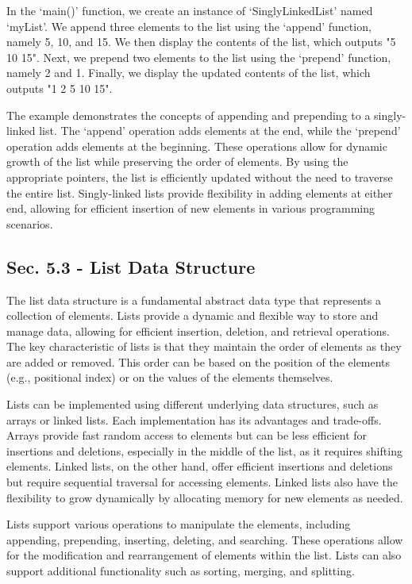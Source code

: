 \begin{solution}
    In the `main()' function, we create an instance of `SinglyLinkedList' named `myList'. We append three elements to the list using the `append' function, namely 5, 10, and 15. We then display the contents of the list, which outputs 
    "5 10 15". Next, we prepend two elements to the list using the `prepend' function, namely 2 and 1. Finally, we display the updated contents of the list, which outputs "1 2 5 10 15".

    The example demonstrates the concepts of appending and prepending to a singly-linked list. The `append' operation adds elements at the end, while the `prepend' operation adds elements at the beginning. These operations allow for dynamic 
    growth of the list while preserving the order of elements. By using the appropriate pointers, the list is efficiently updated without the need to traverse the entire list. Singly-linked lists provide flexibility in adding elements at 
    either end, allowing for efficient insertion of new elements in various programming scenarios.
\end{solution}

\subsection*{Sec. 5.3 - List Data Structure}

The list data structure is a fundamental abstract data type that represents a collection of elements. Lists provide a dynamic and flexible way to store and manage data, allowing for efficient insertion, deletion, and retrieval operations. 
The key characteristic of lists is that they maintain the order of elements as they are added or removed. This order can be based on the position of the elements (e.g., positional index) or on the values of the elements themselves.

Lists can be implemented using different underlying data structures, such as arrays or linked lists. Each implementation has its advantages and trade-offs. Arrays provide fast random access to elements but can be less efficient for insertions 
and deletions, especially in the middle of the list, as it requires shifting elements. Linked lists, on the other hand, offer efficient insertions and deletions but require sequential traversal for accessing elements. Linked lists also have 
the flexibility to grow dynamically by allocating memory for new elements as needed.

Lists support various operations to manipulate the elements, including appending, prepending, inserting, deleting, and searching. These operations allow for the modification and rearrangement of elements within the list. Lists can also support 
additional functionality such as sorting, merging, and splitting.

